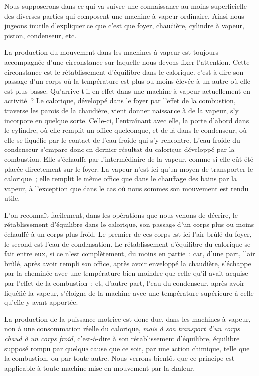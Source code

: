 \documentclass[french,twoside]{book} %
\begin{document}
Nous supposerons dans ce qui va suivre une connaissance au moins superficielle des diverses parties qui composent une machine à vapeur ordinaire. Ainsi nous jugeons inutile d’expliquer ce que c’est que foyer, chaudière, cylindre à vapeur, piston, condenseur, etc.\par
La production du mouvement dans les machines à vapeur est toujours accompagnée d’une circonstance sur laquelle nous devons fixer l’attention. Cette circonstance est le rétablissement d’équilibre dans le calorique, c’est-à-dire son passage d’un corps où la température est plus ou moins élevée à un autre où elle est plus basse. Qu’arrive-t-il en effet dans une machine à vapeur actuellement en activité ? Le calorique, développé dans le foyer par l’effet de la combustion, traverse les parois de la chaudière, vient donner naissance à de la vapeur, s’y incorpore en quelque sorte. Celle-ci, l’entraînant avec elle, la porte d’abord dans le cylindre, où elle remplit un office quelconque, et de là dans le condenseur, où elle se liquéfie par le contact de l’eau froide qui s’y rencontre. L’eau froide du condenseur s’empare donc en dernier résultat du calorique développé par la combustion. Elle s’échauffe par l’intermédiaire de la vapeur, comme si elle eût été placée directement sur le foyer. La vapeur n’est ici qu’un moyen de transporter le calorique ; elle remplit le même office que dans le chauffage des bains par la vapeur, à l’exception que dans le cas où nous sommes son mouvement est rendu utile.\par
L’on reconnaît facilement, dans les opérations que nous venons de décrire, le rétablissement d’équilibre dans le calorique, son passage d’un corps plus ou moins échauffé à un corps plus froid. Le premier de ces corps est ici l’air brûlé du foyer, le second est l’eau de condensation. Le rétablissement d’équilibre du calorique se fait entre eux, si ce n’est complètement, du moins en partie : car, d’une part, l’air brûlé, après avoir rempli son office, après avoir enveloppé la chaudière, s’échappe par la cheminée avec une température bien moindre que celle qu’il avait acquise par l’effet de la combustion ; et, d’autre part, l’eau du condenseur, après avoir liquéfié la vapeur, s’éloigne de la machine avec une température supérieure à celle qu’elle y avait apportée.\par
La production de la puissance motrice est donc due, dans les machines à vapeur, non à une consommation réelle du calorique, \emph{mais à son transport d’un corps chaud à un corps froid}, c’est-à-dire à son rétablissement d’équilibre, équilibre supposé rompu par quelque cause que ce soit, par une action chimique, telle que la combustion, ou par toute autre. Nous verrons bientôt que ce principe est applicable à toute machine mise en mouvement par la chaleur.\par
\end{document}
